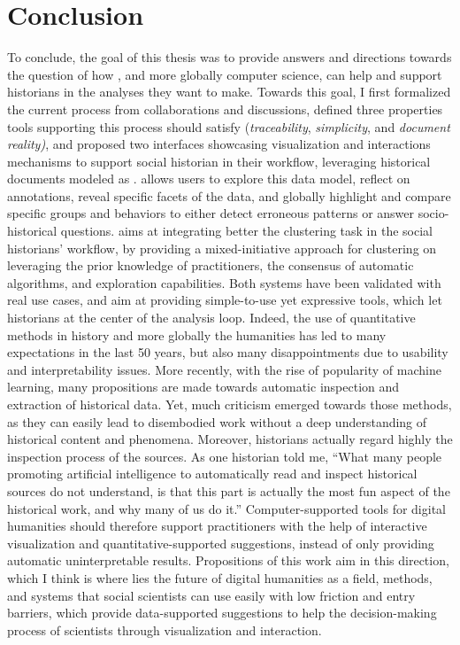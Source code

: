\section{Conclusion}


To conclude, the goal of this thesis was to provide answers and directions towards the question of how \va, and more globally computer science, can help and support historians in the analyses they want to make.
Towards this goal, I first formalized the current \hsna process from collaborations and discussions, defined three properties tools supporting this process should satisfy (\emph{traceability}, \emph{simplicity}, and \emph{document reality)}, and proposed two interfaces showcasing visualization and interactions mechanisms to support social historian in their workflow, leveraging historical documents modeled as \modelplural.
\combinet allows users to explore this data model, reflect on annotations, reveal specific facets of the data, and globally highlight and compare specific groups and behaviors to either detect erroneous patterns or answer socio-historical questions.
\pkclustering aims at integrating better the clustering task in the social historians' workflow, by providing a mixed-initiative approach for clustering on \modelplural leveraging the prior knowledge of practitioners, the consensus of automatic algorithms, and exploration capabilities.
Both systems have been validated with real use cases, and aim at providing simple-to-use yet expressive tools, which let historians at the center of the analysis loop.
Indeed, the use of quantitative methods in history and more globally the humanities has led to many expectations in the last 50 years, but also many disappointments due to usability and interpretability issues.
More recently, with the rise of popularity of machine learning, many propositions are made towards automatic inspection and extraction of historical data.
Yet, much criticism emerged towards those methods, as they can easily lead to disembodied work without a deep understanding of historical content and phenomena.
Moreover, historians actually regard highly the inspection process of the sources.
As one historian told me, ``What many people promoting artificial intelligence to automatically read and inspect historical sources do not understand, is that this part is actually the most fun aspect of the historical work, and why many of us do it.''
Computer-supported tools for digital humanities should therefore support practitioners with the help of interactive visualization and quantitative-supported suggestions, instead of only providing automatic uninterpretable results.
Propositions of this work aim in this direction, which I think is where lies the future of digital humanities as a field, \ie methods, and systems that social scientists can use easily with low friction and entry barriers, which provide data-supported suggestions to help the decision-making process of scientists through visualization and interaction.





